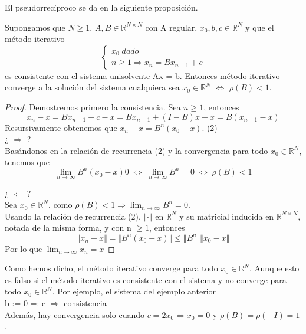 El pseudorrecíproco se da en la siguiente proposición.

\begin{nprop}
Supongamos que $N \geq 1$, $A,B \in \mathbb{R}^{N \times N}$ con A regular, $x_0,b,c \in \mathbb{R}^N$ y que el método iterativo
\[ \left\{ \begin{array}{c}
x_0 \; dado \\
n \geq 1 \Rightarrow x_n = Bx_{n-1}+c
\end{array}
\right. \]
es consistente con el sistema unisolvente Ax = b. Entonces método iterativo converge a la solución del sistema cualquiera sea $x_0 \in \mathbb{R}^N$ $\Leftrightarrow$ $\rho (B) < 1$.
\end{nprop}

	\begin{proof}
	Demostremos primero la consistencia. Sea $n \geq 1$, entonces
	\[ x_n - x = Bx_{n-1} + c - x = Bx_{n-1} + (I - B)x - x = B(x_{n-1} - x) \]
	Resursivamente obtenemos que $x_n - x = B^n (x_0 - x)$. (2)\\
	¿ $\Rightarrow$ ?\\
	Basándonos en la relación de recurrencia (2) y la convergencia para todo $x_0 \in \mathbb{R}^N$, tenemos que
	\[ \lim_{n \rightarrow \infty} B^n(x_0 - x) 0
	\; \Leftrightarrow \;
	\lim_{n \rightarrow \infty} B^n = 0
	\; \Leftrightarrow \;
	\rho (B) < 1 \]

	¿ $\Leftarrow$ ?\\
	Sea $x_0 \in \mathbb{R}^N$, como $\rho (B) < 1 \Rightarrow \lim_{n \rightarrow \infty} B^n = 0$.\\
	Usando la relación de recurrencia (2), $\Vert \cdot \Vert$ en $\mathbb{R}^N$ y su matricial inducida en $\mathbb{R}^{N \times N}$, notada de la misma forma, y con n $\geq 1$, entonces
	\[ \Vert x_n - x \Vert = \Vert B^n(x_0-x) \Vert \leq \Vert B^n \Vert \Vert x_0 - x \Vert \]
	Por lo que $\lim_{n \rightarrow \infty}x_n = x$
	\end{proof}

\begin{nota}
Como hemos dicho, el método iterativo converge para todo $x_0 \in \mathbb{R}^N$. Aunque esto es falso si el método iterativo es consistente con el sistema y no converge para todo $x_0 \in \mathbb{R}^N$. Por ejemplo, el sistema del ejemplo anterior\\
b := 0 =: c $\Rightarrow$ consistencia\\
Además, hay convergencia solo cuando $c = 2x_0 \Leftrightarrow x_0 = 0$ y $\rho (B) = \rho (-I) = 1$.
\end{nota}

